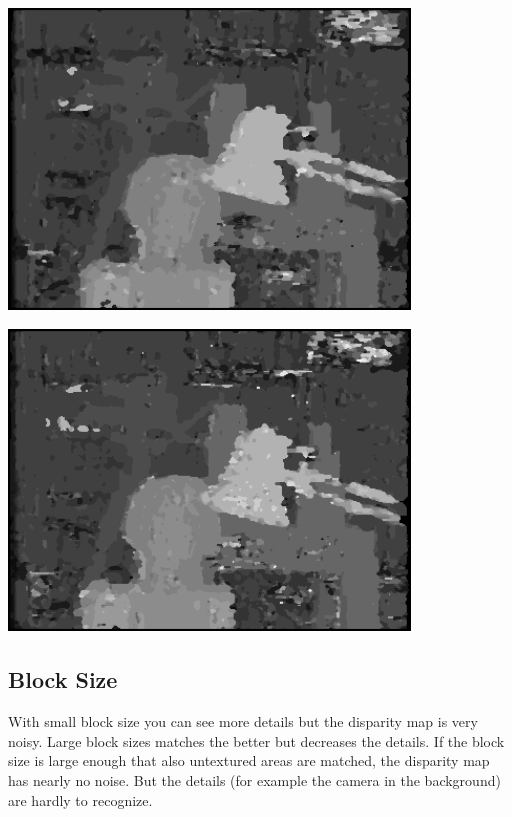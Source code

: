 \documentclass[a4paper]{scrartcl}
\begin{document}
\vspace{1cm}
\begin{minipage}{0.8\textwidth}
  \centering
  \includegraphics[width=0.8\textwidth]{disparity-r2-sad-d20-m1.png}
  \label{fig:disparity-r2-sad-d20-m1}
\end{minipage}

\vspace{1cm}
\begin{minipage}{0.8\textwidth}
  \centering
  \includegraphics[width=0.8\textwidth]{disparity-r2-ccr-d20-m1.png}
  \label{fig:disparity-r2-ccr-d20-m1}
\end{minipage}


\subsection{Block Size}

With small block size you can see more details but the disparity map is very
noisy. Large block sizes matches the better but decreases the details. If the
block size is large enough that also untextured areas are matched, the
disparity map has nearly no noise. But the details (for example the camera in
the background) are hardly to recognize.
\end{document}
